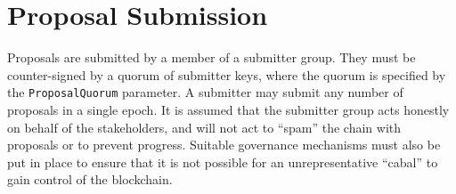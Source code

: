 \newpage
\section{Proposal Submission}
\label{sect:submission}

Proposals are submitted by a member of a submitter group.  They must be counter-signed by a quorum of submitter keys, where the quorum is specified by the \texttt{ProposalQuorum} parameter.
A submitter may submit any number of proposals in a single epoch.
It is assumed that the submitter group acts honestly on behalf of the stakeholders, and will not act to ``spam'' the chain with proposals or to prevent progress.  Suitable governance mechanisms must also be put in place to ensure that it is not possible for an unrepresentative ``cabal'' to gain control of the blockchain.

